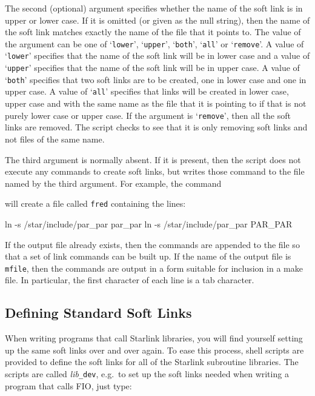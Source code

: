 \documentclass[11pt,nolof]{starlink}
\begin{document}
The second (optional) argument specifies whether the name of the soft link is
in upper or lower case. If it is omitted (or given as the null string), then
the name of the soft link matches exactly the name of the file that it points
to. The value of the argument can be one of `\texttt{lower}', `\texttt{upper}', `\texttt{both}', `\texttt{all}' or `\texttt{remove}'. A value of `\texttt{lower}' specifies that
the name of the soft link will be in lower case and a value of `\texttt{upper}'
specifies that the name of the soft link will be in upper case. A value of
`\texttt{both}' specifies that two soft links are to be created, one in lower case
and one in upper case. A value of `\texttt{all}' specifies that links will be
created in lower case, upper case and with the same name as the file that it is
pointing to if that is not purely lower case or upper case. If the argument is
`\texttt{remove}', then all the soft links are removed. The script checks to see
that it is only removing soft links and not files of the same name.

The third argument is normally absent. If it is present, then the script does
not execute any commands to create soft links, but writes those command to the
file named by the third argument. For example, the command

\begin{terminalv}
\end{terminalv}

will create a file called \texttt{fred} containing the lines:

\begin{terminalv}
ln -s /star/include/par_par par_par
ln -s /star/include/par_par PAR_PAR
\end{terminalv}

If the output file already exists, then the commands are appended to the file
so that a set of link commands can be built up. If the name of the output file
is \texttt{mfile}, then the commands are output in a form suitable for inclusion
in a make file. In particular, the first character of each line is a tab
character.

\subsection{Defining Standard Soft Links}

When writing programs that call Starlink libraries, you will find yourself
setting up the same soft links over and over again. To ease this process, shell
scripts are provided to define the soft links for all of the Starlink
subroutine libraries. The scripts are called \textit{lib}{\tt\_dev}, e.g.\ to set
up the soft links needed when writing a program that calls FIO, just type:
\end{document}
